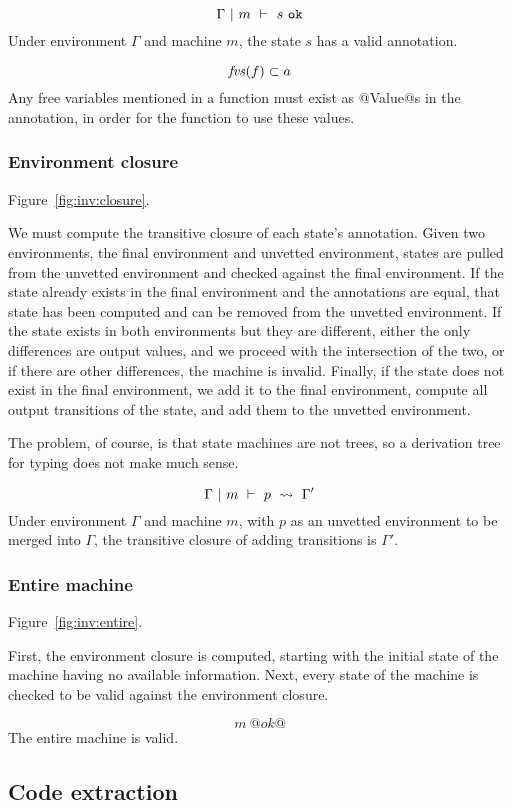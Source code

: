 $$ \Gamma ~|~ m ~\vdash~ s~\mathtt{ok} $$
Under environment $\Gamma$ and machine $m$, the state $s$ has a valid annotation.

$$ \mathit{fvs}(f) \subset a $$
Any free variables mentioned in a function must exist as @Value@s in the annotation, in order for the function to use these values.

\subsubsection{Environment closure}
Figure~\ref{fig:inv:closure}.

We must compute the transitive closure of each state's annotation.
Given two environments, the final environment and unvetted environment, states are pulled from the unvetted environment and checked against the final environment.
If the state already exists in the final environment and the annotations are equal, that state has been computed and can be removed from the unvetted environment.
If the state exists in both environments but they are different, either the only differences are output values, and we proceed with the intersection of the two, or if there are other differences, the machine is invalid.
Finally, if the state does not exist in the final environment, we add it to the final environment, compute all output transitions of the state, and add them to the unvetted environment.

The problem, of course, is that state machines are not trees, so a derivation tree for typing does not make much sense.

$$ \Gamma ~|~ m ~\vdash~ p ~\rightsquigarrow~ \Gamma' $$
Under environment $\Gamma$ and machine $m$, with $p$ as an unvetted environment to be merged into $\Gamma$, the transitive closure of adding transitions is $\Gamma'$.

\subsubsection{Entire machine}
Figure~\ref{fig:inv:entire}.

First, the environment closure is computed, starting with the initial state of the machine having no available information.
Next, every state of the machine is checked to be valid against the environment closure.

$$ m~@ok@ $$
The entire machine is valid.


\subsection{Code extraction}

